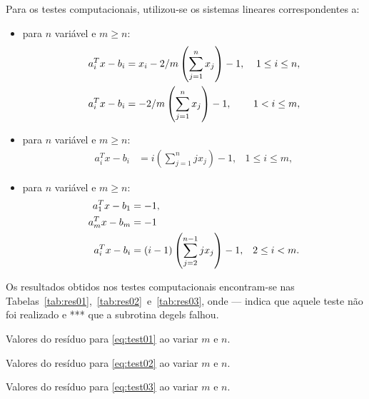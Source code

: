 \documentclass[12pt,a4paper]{article}
\begin{document}
Para os testes computacionais, utilizou-se os sistemas lineares
correspondentes a:
\begin{itemize}
    \item para $n$ variável e $m \geq n$:
        \begin{align}
            a_i^T x - b_i &= x_i - 2/m \left( \sum_{j = 1}^n x_j
            \right) - 1, & 1 \leq i \leq n, \notag \\
            a_i^T x - b_i &= -2/m \left( \sum_{j = 1}^n x_j \right) - 1, & 1
            < i \leq m,
            \label{eq:test01}
        \end{align}
    \item para $n$ variável e $m \geq n$:
        \begin{align}
            a_i^T x - b_i &= i \left( \sum_{j = 1}^n j x_j \right) - 1, & 1 \leq
            i \leq m,
            \label{eq:test02}
        \end{align}
    \item para $n$ variável e $m \geq n$:
        \begin{align}
            a_1^T x - b_1 &= -1, \notag \\
            a_m^T x - b_m &= -1
            \label{eq:test03} \\
            a_i^T x - b_i &= (i - 1) \left( \sum_{j = 2}^{n - 1} j x_j
            \right) - 1, & 2 \leq i < m. \notag
        \end{align}
\end{itemize}

Os resultados obtidos nos testes computacionais encontram-se nas
Tabelas~\ref{tab:res01},~\ref{tab:res02}~e~\ref{tab:res03}, onde --- indica
que aquele teste não foi realizado e *** que a subrotina degels falhou.
\begin{table}[!htb]
    \centering
    \caption{Valores do resíduo para \eqref{eq:test01} ao variar $m$ e $n$.}
    \label{tab:res01}
\end{table}
\begin{table}[!htb]
    \centering
    \caption{Valores do resíduo para \eqref{eq:test02} ao variar $m$ e $n$.}
    \label{tab:res02}
\end{table}
\begin{table}[!htb]
    \centering
    \caption{Valores do resíduo para \eqref{eq:test03} ao variar $m$ e $n$.}
    \label{tab:res03}
\end{table}
\end{document}
